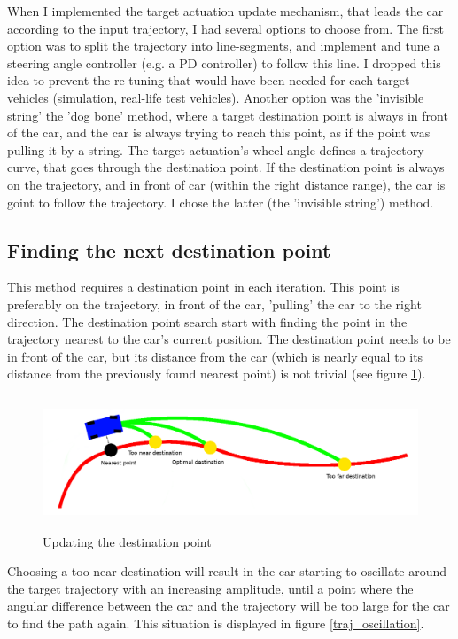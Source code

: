 When I implemented the target actuation update mechanism, that leads the car according to the input trajectory, I had several options to choose from. The first option was to split the trajectory into line-segments, and implement and tune a steering angle controller (e.g. a PD controller) to follow this line. I dropped this idea to prevent the re-tuning that would have been needed for each target vehicles (simulation, real-life test vehicles). Another option was the 'invisible string' the 'dog bone' method, where a target destination point is always in front of the car, and the car is always trying to reach this point, as if the point was pulling it by a string. The target actuation's wheel angle defines a trajectory curve, that goes through the destination point. If the destination point is always on the trajectory, and in front of car (within the right distance range), the car is goint to follow the trajectory. I chose the latter (the 'invisible string') method.

\subsection{Finding the next destination point}
This method requires a destination point in each iteration. This point is preferably on the trajectory, in front of the car, 'pulling' the car to the right direction. The destination point search start with finding the point in the trajectory nearest to the car's current position. The destination point needs to be in front of the car, but its distance from the car (which is nearly equal to its distance from the previously found nearest point) is not trivial (see figure \ref{dest_point_update}).

\begin{figure}[!ht]
    \centering
    \includegraphics[height=40mm]{figures/raw/dest_point_update.png}
    \caption{Updating the destination point}
    \label{dest_point_update}
\end{figure}

Choosing a too near destination will result in the car starting to oscillate around the target trajectory with an increasing amplitude, until a point where the angular difference between the car and the trajectory will be too large for the car to find the path again. This situation is displayed in figure \ref{traj_oscillation}.

